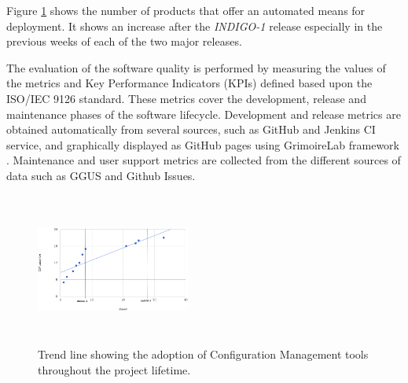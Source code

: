 \documentclass[journal]{IEEEtran}
\begin{document}
Figure \ref{fig:fig_confman} shows the number of products that offer an automated means
for deployment. It shows an increase after the {\sl INDIGO-1} release especially
in the previous weeks of each of the two major releases.

The evaluation of the software quality is performed by measuring the values of
the metrics and Key Performance Indicators (KPIs) defined based upon the
ISO/IEC 9126 standard. These metrics cover the development, release and
maintenance phases of the software lifecycle. Development and release metrics
are obtained automatically from several sources, such as GitHub and Jenkins CI
service, and graphically displayed as GitHub pages using GrimoireLab framework
\cite{grimoirelab}. Maintenance and user support metrics are collected from the
different sources of data such as GGUS \cite{ggus} and Github Issues.

\begin{figure}[ht]
\centering
\includegraphics[width=0.45\textwidth, height=50mm]{images/confman.png}
\caption{Trend line showing the adoption of Configuration Management tools throughout the project lifetime.}
\label{fig:fig_confman}
\end{figure}
\end{document}
